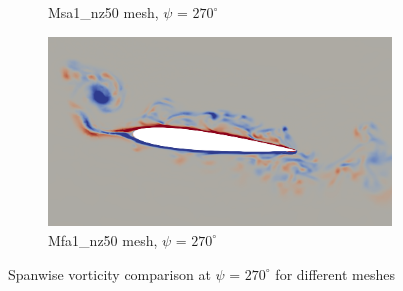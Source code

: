 \begin{figure}[H]
\begin{subfigure}[b]{0.475\textwidth}
\caption{Msa1\_nz50 mesh, $\psi$ = $270^\circ$}
\label{fig:hadapt_psi270}
\end{subfigure}
\begin{subfigure}[b]{0.475\textwidth}
\centering
\includegraphics[width=1\textwidth]{figures/adapt_strat/vorticity_plots/Mfa1_50/phase_270.png}
\caption{Mfa1\_nz50 mesh, $\psi$ = $270^\circ$}
\label{fig:FB_psi270}
\end{subfigure}
\caption{Spanwise vorticity comparison at $\psi$ = $270^\circ$ for different meshes}
\label{fig:vorticity_270}
\end{figure}

